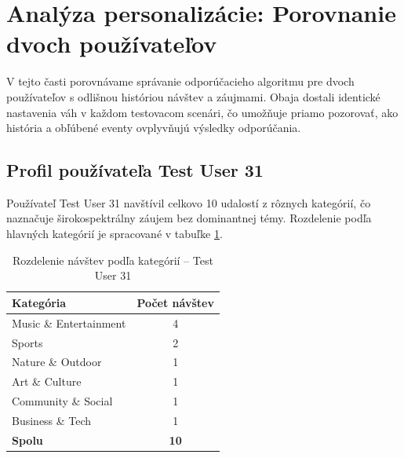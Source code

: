 \section{Analýza personalizácie: Porovnanie dvoch používateľov}

V tejto časti porovnávame správanie odporúčacieho algoritmu pre dvoch používateľov s odlišnou históriou návštev a záujmami. Obaja dostali identické nastavenia váh v každom testovacom scenári, čo umožňuje priamo pozorovať, ako história a obľúbené eventy ovplyvňujú výsledky odporúčania.

\subsection{Profil používateľa Test User 31}

Používateľ Test User 31 navštívil celkovo 10 udalostí z rôznych kategórií, čo naznačuje širokospektrálny záujem bez dominantnej témy. Rozdelenie podľa hlavných kategórií je spracované v tabuľke \ref{tab:rozdelenie_u31}.

\begin{table}[H]
\centering
\caption{Rozdelenie návštev podľa kategórií – Test User 31}
\label{tab:rozdelenie_u31}
\begin{tabular}{|l|c|}
\hline
\textbf{Kategória} & \textbf{Počet návštev} \\ \hline
Music \& Entertainment & 4 \\
Sports                 & 2 \\
Nature \& Outdoor      & 1 \\
Art \& Culture         & 1 \\
Community \& Social    & 1 \\
Business \& Tech       & 1 \\ \hline
\textbf{Spolu}         & \textbf{10} \\ \hline
\end{tabular}
\end{table}

